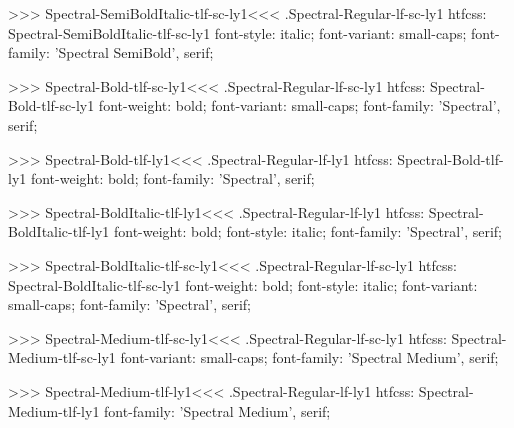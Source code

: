 >>>
\<Spectral-SemiBoldItalic-tlf-sc-ly1\><<<
.Spectral-Regular-lf-sc-ly1
htfcss:  Spectral-SemiBoldItalic-tlf-sc-ly1  font-style: italic; font-variant: small-caps; font-family: 'Spectral SemiBold', serif;

>>>
\<Spectral-Bold-tlf-sc-ly1\><<<
.Spectral-Regular-lf-sc-ly1
htfcss:  Spectral-Bold-tlf-sc-ly1  font-weight: bold; font-variant: small-caps; font-family: 'Spectral', serif;

>>>
\<Spectral-Bold-tlf-ly1\><<<
.Spectral-Regular-lf-ly1
htfcss:  Spectral-Bold-tlf-ly1  font-weight: bold; font-family: 'Spectral', serif;

>>>
\<Spectral-BoldItalic-tlf-ly1\><<<
.Spectral-Regular-lf-ly1
htfcss:  Spectral-BoldItalic-tlf-ly1  font-weight: bold; font-style: italic; font-family: 'Spectral', serif;

>>>
\<Spectral-BoldItalic-tlf-sc-ly1\><<<
.Spectral-Regular-lf-sc-ly1
htfcss:  Spectral-BoldItalic-tlf-sc-ly1  font-weight: bold; font-style: italic; font-variant: small-caps; font-family: 'Spectral', serif;

>>>
\<Spectral-Medium-tlf-sc-ly1\><<<
.Spectral-Regular-lf-sc-ly1
htfcss:  Spectral-Medium-tlf-sc-ly1  font-variant: small-caps; font-family: 'Spectral Medium', serif;

>>>
\<Spectral-Medium-tlf-ly1\><<<
.Spectral-Regular-lf-ly1
htfcss:  Spectral-Medium-tlf-ly1  font-family: 'Spectral Medium', serif;

